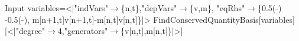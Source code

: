 \begin{mmaCell}[moredefined={variables, PartialDVarD, FindConservedQuantityBasis}]{Input}
  variables=<|"indVars"\(\pmb{\to}\)\{n,t\},"depVars"\(\pmb{\to}\)\{v,m\},
  "eqRhs"\(\pmb{\to}\)\{0.5(-)
  -0.5(-),
  m[n+1,t]v[n+1,t]-m[n,t]v[n,t]\}|>
  FindConservedQuantityBasis[variables]
  [<|"degree"\(\pmb{\to}\)4,"generators"\(\pmb{\to}\)\{v[n,t],m[n,t]\}|>]
  
\end{mmaCell}